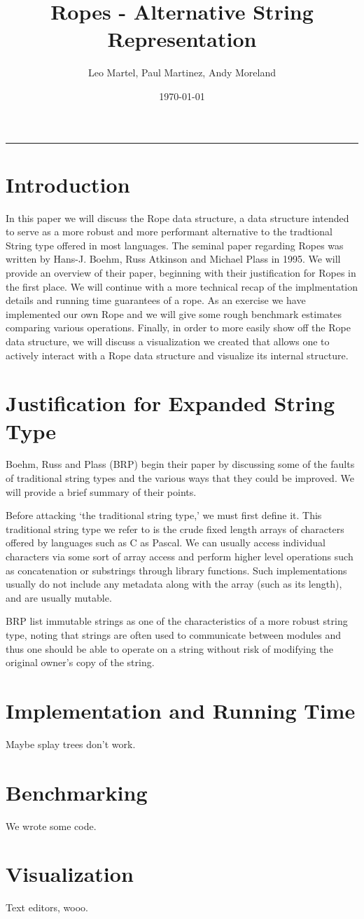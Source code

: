 \documentclass[12pt]{article}
\title{Ropes - Alternative String Representation}
\author{Leo Martel, Paul Martinez, Andy Moreland}
\date{\today}
\begin{document}
\maketitle
\vspace{-0.3in}
\rule{\linewidth}{0.4pt}


\section{Introduction}

In this paper we will discuss the Rope data structure, a data structure intended to serve as a more robust and more performant alternative to the tradtional String type offered in most languages.
The seminal paper regarding Ropes was written by Hans-J. Boehm, Russ Atkinson and Michael Plass in 1995.
We will provide an overview of their paper, beginning with their justification for Ropes in the first place.
We will continue with a more technical recap of the implmentation details and running time guarantees of a rope.
As an exercise we have implemented our own Rope and we will give some rough benchmark estimates comparing various operations.
Finally, in order to more easily show off the Rope data structure, we will discuss a visualization we created that allows one to actively interact with a Rope data structure and visualize its internal structure.

\section{Justification for Expanded String Type}

Boehm, Russ and Plass (BRP) begin their paper by discussing some of the faults of traditional string types and the various ways that they could be improved.
We will provide a brief summary of their points.

Before attacking `the traditional string type,' we must first define it.
This traditional string type we refer to is the crude fixed length arrays of characters offered
by languages such as C as Pascal.
We can usually access individual characters via some sort of array access and perform higher level operations such as concatenation or substrings through library functions.
Such implementations usually do not include any metadata along with the array (such as its length), and are usually mutable.

BRP list immutable strings as one of the characteristics of a more robust string type, noting that strings are often used to communicate between modules and thus one should be able to operate on a string without risk of modifying the original owner's copy of the string.

\section{Implementation and Running Time}

Maybe splay trees don't work.

\section{Benchmarking}

We wrote some code.

\section{Visualization}

Text editors, wooo.
\end{document}
